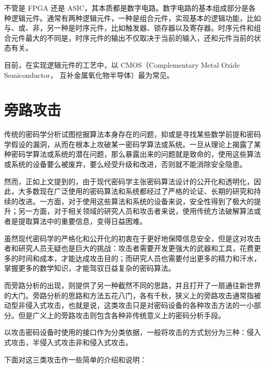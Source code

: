 不管是 FPGA 还是 ASIC，其本质都是数字电路。数字电路的基本组成部分是各种逻辑元件。通常有两种逻辑元件，一种是组合元件，实现基本的逻辑功能，比如与、或、非，另一种是时序元件，比如触发器、锁存器以及寄存器。时序元件和组合元件最大的不同是，时序元件的输出不仅取决于当前的输入，还和元件当前的状态有关。

目前，在实现逻辑元件的工艺中，以 CMOS（Complementary Metal Oxide Semiconductor， 互补金属氧化物半导体）最为常见。

\section{旁路攻击} %
传统的密码学分析试图挖掘算法本身存在的问题，抑或是寻找某些数学前提和密码学假设的漏洞，从而在根本上攻破某一密码学算法或系统。一旦从理论上揭露了某种密码学算法或系统的潜在问题，那么暴露出来的问题就是致命的，使用这些算法或系统的设备要么被废弃，要么经受升级和改进，否则就不能消除安全隐患。

然而，正如上文提到的，由于现代密码学主张密码算法设计的公开化和透明化，因此，大多数现在广泛使用的密码算法和系统都经过了严格的论证、长期的研究和持续的改进。一方面，对于使用这些算法和系统的设备来说，安全性得到了极大的提升；另一方面，对于相关领域的研究人员和攻击者来说，使用传统方法破解算法或者是提取算法中的重要信息，变得日益困难。

虽然现代密码学的严格化和公开化的初衷在于更好地保障信息安全，但是这对攻击者和研究人员无疑也是巨大的挑战：攻击者需要开发更强大的武器和工具，花费更多的时间和成本，才能达成攻击目的；而研究人员也需要付出更多的精力和汗水，掌握更多的数学知识，才能驾驭日益复杂的密码算法。

而旁路分析的出现，则提供了另一种截然不同的思路，并且打开了一扇通往新世界的大门。旁路分析的思路和方法五花八门，各有千秋，狭义上的旁路攻击通常指被动型非侵入式攻击，也就是说，这类攻击只是对密码设备的各种攻击方法的一小部分。但是广义上的旁路攻击则包含各种非传统意义上的密码分析手段。

以攻击密码设备时使用的接口作为分类依据，一般将攻击的方式划分为三种：侵入式攻击，半侵入式攻击非和侵入式攻击。

\vspace*{0.5\baselineskip}

下面对这三类攻击作一些简单的介绍和说明： \cite{paa_cn}

